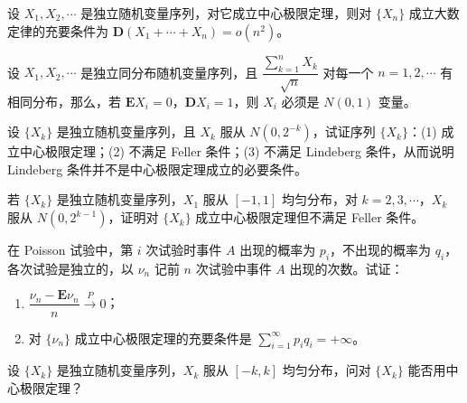 \documentclass[../../main.tex]{subfiles}
\begin{document}
\begin{exercise}\label{exercise:ch05-51}
设 $X_1,X_2,\cdots$ 是独立随机变量序列，对它成立中心极限定理，则对 $\{X_n\}$ 成立大数定律的充要条件为 $\boldsymbol{D}(X_1+\cdots+X_n)=o(n^{2})$。
\end{exercise}

\begin{exercise}\label{exercise:ch05-52}
设 $X_1,X_2,\cdots$ 是独立同分布随机变量序列，且 $\dfrac{\sum_{k=1}^{n}X_k}{\sqrt{n}}$ 对每一个 $n=1,2,\cdots$ 有相同分布，那么，若 $\boldsymbol{E}X_i=0$，$\boldsymbol{D}X_i=1$，则 $X_i$ 必须是 $N(0,1)$ 变量。
\end{exercise}

\begin{exercise}\label{exercise:ch05-53}
设 $\{X_k\}$ 是独立随机变量序列，且 $X_k$ 服从 $N(0,2^{-k})$，试证序列 $\{X_k\}$：(1) 成立中心极限定理；(2) 不满足 Feller 条件；(3) 不满足 Lindeberg 条件，从而说明 Lindeberg 条件并不是中心极限定理成立的必要条件。
\end{exercise}

\begin{exercise}\label{exercise:ch05-54}
若 $\{X_k\}$ 是独立随机变量序列，$X_1$ 服从 $[-1,1]$ 均匀分布，对 $k=2,3,\cdots$，$X_k$ 服从 $N(0,2^{k-1})$，证明对 $\{X_k\}$ 成立中心极限定理但不满足 Feller 条件。
\end{exercise}

\begin{exercise}\label{exercise:ch05-55}
在 Poisson 试验中，第 $i$ 次试验时事件 $A$ 出现的概率为 $p_i$，不出现的概率为 $q_i$，各次试验是独立的，以 $\nu_n$ 记前 $n$ 次试验中事件 $A$ 出现的次数。试证：
\begin{enumerate}
\item $\dfrac{\nu_n-\boldsymbol{E}\nu_n}{n}\xrightarrow{P}0$；
\item 对 $\{\nu_n\}$ 成立中心极限定理的充要条件是 $\sum_{i=1}^{\infty}p_iq_i=+\infty$。
\end{enumerate}
\end{exercise}

\begin{exercise}\label{exercise:ch05-56}
设 $\{X_k\}$ 是独立随机变量序列，$X_k$ 服从 $[-k,k]$ 均匀分布，问对 $\{X_k\}$ 能否用中心极限定理？
\end{exercise}
\end{document}
